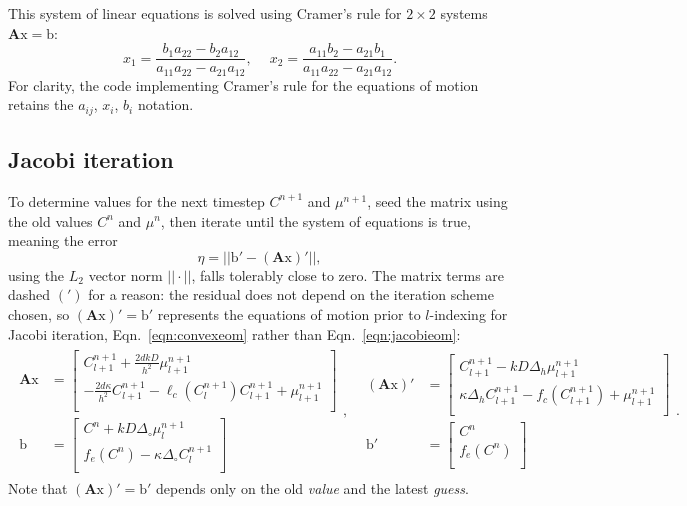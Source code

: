 	This system of linear equations is solved using Cramer's rule for $2\times 2$ systems $\mathbf{A}\mathrm{x}=\mathrm{b}$:
	\[
		x_1 = \frac{b_1a_{22} - b_2a_{12}}{a_{11}a_{22} - a_{21}a_{12}}, \
		\hspace{1em}x_2 = \frac{a_{11}b_2 - a_{21}b_1}{a_{11}a_{22} - a_{21}a_{12}}.
	\]
	For clarity, the code implementing Cramer's rule for the equations of motion retains the $a_{ij}$, $x_i$, $b_i$ notation.		

	\subsection{Jacobi iteration}
	To determine values for the next timestep $C^{n+1}$ and $\mu^{n+1}$, seed the matrix using the old values $C^n$ and $\mu^n$,
	then iterate until the system of equations is true, meaning the error
	\[\eta = ||\mathrm{b}' - \left(\mathbf{A}\mathrm{x}\right)'||,\]
	using the $L_2$ vector norm $||\cdot ||$, falls tolerably close to zero.
	The matrix terms are dashed $(')$ for a reason:
	the residual does not depend on the iteration scheme chosen, so $\left(\mathbf{A}\mathrm{x}\right)'=\mathrm{b}'$ 
	represents the equations of motion prior to $l$-indexing for Jacobi iteration, Eqn.~\ref{eqn:convexeom} rather than Eqn.~\ref{eqn:jacobieom}:
	\begin{align*}
		\begin{split}
			\mathbf{A}\mathrm{x} &=
			\begin{bmatrix}
				C_{l+1}^{n+1} + \frac{2dkD}{h^2}\mu_{l+1}^{n+1}\\[0.5em]
				-\frac{2d\kappa}{h^2}C_{l+1}^{n+1} - \ell_c(C_l^{n+1})C_{l+1}^{n+1} + \mu_{l+1}^{n+1}\\
			\end{bmatrix}\\
			\mathrm{b} &=
			\begin{bmatrix}
				C^n + kD\Delta_\circ\mu_l^{n+1}\\[0.5em]
				f_e(C^n) - \kappa\Delta_\circ C_l^{n+1}\\
			\end{bmatrix}
		\end{split},
		&
		\begin{split}
			\left(\mathbf{A}\mathrm{x}\right)' &=
			\begin{bmatrix}
				C_{l+1}^{n+1} - kD\Delta_h\mu_{l+1}^{n+1}\\[0.5em]
				        \kappa\Delta_hC_{l+1}^{n+1} - f_c(C_{l+1}^{n+1}) + \mu_{l+1}^{n+1}\\
			\end{bmatrix}\\
			\mathrm{b}' &=
			\begin{bmatrix}
				C^n\\[0.5em]
				f_e(C^n)\\
			\end{bmatrix}
		\end{split}.
	\end{align*}
	Note that $\left(\mathbf{A}\mathrm{x}\right)'=\mathrm{b}'$ depends only on the old \emph{value} and the latest \emph{guess}.
	
